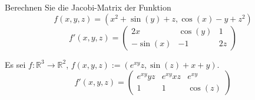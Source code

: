 Berechnen Sie die Jacobi-Matrix der Funktion
\begin{displaymath}
  f(x,y,z) = (x^2 + \sin(y) + z, \cos(x) - y + z^2)
\end{displaymath}
\begin{displaymath}
  f'(x,y,z) =
  \begin{pmatrix}
    2x & \cos(y) & 1\\
    -\sin(x) & -1 & 2z
  \end{pmatrix}
\end{displaymath}

Es sei $f : \mathbb{R}^3 \to \mathbb{R}^2$, $f(x,y,z) := (e^{xy}z, \sin(z) + x + y)$.
\begin{displaymath}
  f'(x,y,z) =
  \begin{pmatrix}
    e^{xy}yz & e^{xy}xz & e^{xy}\\
    1 & 1 & \cos(z)
  \end{pmatrix}
\end{displaymath}

